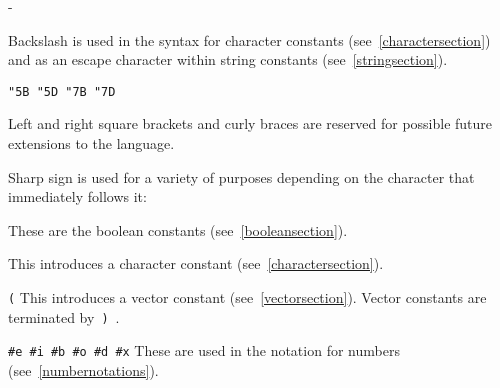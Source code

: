 \begin{list}{}{\advance{}-
    \let\makelabel\cphmakelabel}
\item[\backwhack]
Backslash is used in the syntax for character constants
(see~\ref{charactersection}) and as an escape character within string
constants (see~\ref{stringsection}).

\hbox{\tt \char"5B{} \char"5D{} \char"7B{} \char"7D}
\item[\copy0]
\hspace*{\fill}\newline
Left and right square brackets and curly braces
are reserved for possible future extensions to the language.

\item[\sharpsign] Sharp sign is used for a variety of purposes depending on
the character that immediately follows it:

\item[\schtrue{} \schfalse{}]
\hspace*{\fill}\newline
These are the boolean constants (see~\ref{booleansection}).

\item[\sharpsign\backwhack]
This introduces a character constant (see~\ref{charactersection}).

\item[\sharpsign\tt(]
This introduces a vector constant (see~\ref{vectorsection}).  Vector constants
are terminated by~{\tt)}~.

\item[{\tt\#e \#i \#b \#o \#d \#x}]
\hspace*{\fill}\newline
These are used in the notation for numbers (see~\ref{numbernotations}).

\end{list}
